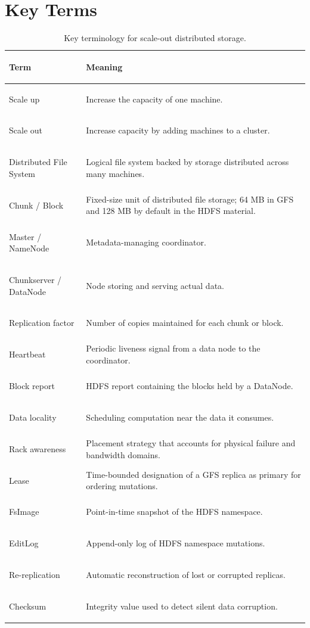 \documentclass[11pt,a4paper,oneside]{book}
\begin{document}
\section{Key Terms}

\begin{table}[htbp]
\centering
\caption{Key terminology for scale-out distributed storage.}
\label{tab:storage-key-terms}
\begin{tabularx}{\textwidth}{>{\bfseries\raggedright\arraybackslash}p{4.0cm} Y}
\toprule
Term & Meaning \\
\midrule
Scale up & Increase the capacity of one machine. \\
Scale out & Increase capacity by adding machines to a cluster. \\
Distributed File System & Logical file system backed by storage distributed across many machines. \\
Chunk / Block & Fixed-size unit of distributed file storage; 64 MB in GFS and 128 MB by default in the HDFS material. \\
Master / NameNode & Metadata-managing coordinator. \\
Chunkserver / DataNode & Node storing and serving actual data. \\
Replication factor & Number of copies maintained for each chunk or block. \\
Heartbeat & Periodic liveness signal from a data node to the coordinator. \\
Block report & HDFS report containing the blocks held by a DataNode. \\
Data locality & Scheduling computation near the data it consumes. \\
Rack awareness & Placement strategy that accounts for physical failure and bandwidth domains. \\
Lease & Time-bounded designation of a GFS replica as primary for ordering mutations. \\
FsImage & Point-in-time snapshot of the HDFS namespace. \\
EditLog & Append-only log of HDFS namespace mutations. \\
Re-replication & Automatic reconstruction of lost or corrupted replicas. \\
Checksum & Integrity value used to detect silent data corruption. \\
\bottomrule
\end{tabularx}
\end{table}
\end{document}
